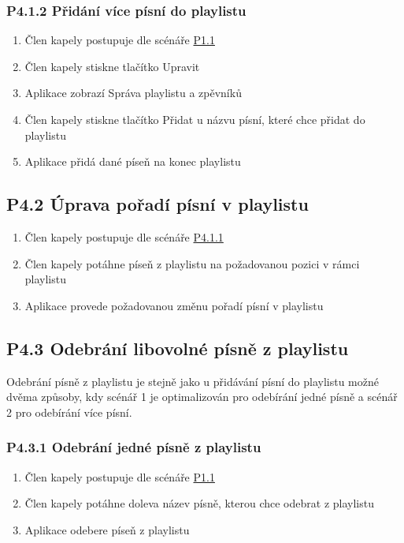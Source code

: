 \subsubsection{P4.1.2 Přidání více písní do playlistu}
\label{P4.1.2}

\begin{enumerate}
    \item Člen kapely postupuje dle scénáře \hyperref[P1.1]{P1.1}
    \item Člen kapely stiskne tlačítko Upravit
    \item Aplikace zobrazí Správa playlistu a zpěvníků
    \item Člen kapely stiskne tlačítko Přidat u názvu písní, které chce přidat do playlistu
    \item Aplikace přidá dané píseň na konec playlistu
\end{enumerate}

\subsection{P4.2 Úprava pořadí písní v playlistu}
\label{P4.2}

\begin{enumerate}
    \item Člen kapely postupuje dle scénáře \hyperref[P4.1.1]{P4.1.1}
    \item Člen kapely potáhne píseň z playlistu na požadovanou pozici v rámci playlistu
    \item Aplikace provede požadovanou změnu pořadí písní v playlistu
\end{enumerate}

\subsection{P4.3 Odebrání libovolné písně z playlistu}
\label{P4.3}

Odebrání písně z playlistu je stejně jako u přidávání písní do playlistu možné dvěma způsoby, kdy scénář 1 je optimalizován pro odebírání jedné písně a scénář 2 pro odebírání více písní.

\subsubsection{P4.3.1 Odebrání jedné písně z playlistu}
\label{P4.3.1}

\begin{enumerate}
    \item Člen kapely postupuje dle scénáře \hyperref[P1.1]{P1.1}
    \item Člen kapely potáhne doleva název písně, kterou chce odebrat z playlistu
    \item Aplikace odebere píseň z playlistu
\end{enumerate}

